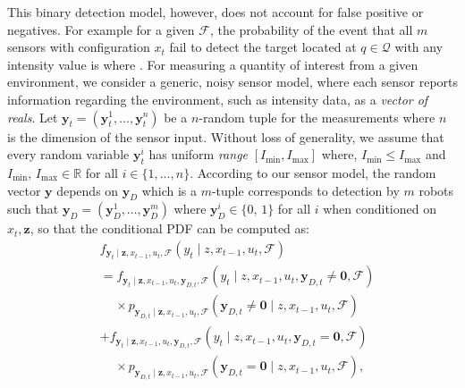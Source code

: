 \documentclass[letterpaper, 10 pt, conference]{ieeeconf}
\newcommand{\rood}[1]{{\color{red}{[#1]}}}
\begin{document}
This binary detection model, however, does not account for false positive or negatives.
For example for a given $\mathcal{F}$, the probability of the event that all $m$ sensors with configuration $x_t$ fail to detect the target located at $q \in \mathcal{Q}$ with any intensity value is
\rood{
\begin{align}
&p_{\bm{y}_{D,t} \mid
	{x}_{t-1},u_t,\bm{z},\mathcal{F}}\left(
\bm{y}_{D,t} = \bm{0} \mid {x}_{t-1},u_t,
\bm{z}=(q,I),\mathcal{F}\right) \nonumber \\
&=p_{\bm{y}_{D,t} \mid
	{x}_{t-1},u_t,\bm{q},\mathcal{F}}\left(
\bm{y}_{D,t} = \bm{0} \mid {x}_{t-1},u_t,
\bm{q}=q,\mathcal{F}\right) \nonumber \\
&= \prod_{i \in \mathcal{F}}
p_{\bm{y}_{D,t}^i \mid
	{x}_{t-1},u_t,\bm{q}}\left(
\bm{y}_{D,t}^i = 0 \mid
{x}_{t-1},u_t,\bm{q}=q\right) \nonumber
\end{align}
}
where \rood{$\bm{0}$ is a $m$-tuple of zeros}. For measuring a quantity of interest from a given environment, we consider a generic, noisy sensor model, where each sensor reports  information regarding the environment, such as intensity data, as a \emph{vector of reals}. 
Let $\bm{y}_t=(\bm{y}_t^1,\dots,\bm{y}_t^n)$ be a $n$-random tuple for the measurements where $n$ is the dimension of the sensor input. 
Without loss of generality, we assume that every random variable $\bm{y}_t^i$ has uniform \emph{range} $[I_{\min},I_{\max}]$ where, $I_{\min} \leq I_{\max}$ and $I_{\min},\,I_{\max} \in \mathbb{R}$ for all $i \in \lbrace 1,\dots,n \rbrace$. According to our sensor model, the random vector $\bm{y}$ depends on $\bm{y}_D$ which is a \rood{random} $m$-tuple corresponds to detection by $m$ robots such that $\bm{y}_D = (\bm{y}_D^1,\dots,\bm{y}_D^m)$ where $\bm{y}_D^i \in \lbrace 0,\,1 \rbrace$ for all $i$ when conditioned on $x_t,\bm{z}$, so that the conditional PDF can be computed as:
\begin{align*}
&f_{\bm{y}_t \mid \bm{z},x_{t-1},u_t,\mathcal{F}}(y_t \mid z,x_{t-1},u_t,\mathcal{F}) \\
&=f_{\bm{y}_t \mid \bm{z},x_{t-1},u_t,\bm{y}_{D,t},\mathcal{F}}(y_t \mid z,x_{t-1},u_t,\bm{y}_{D,t} \neq \mathbf{0},\mathcal{F}) \\ 
&\,\,\,\,\,\,\,\times p_{\bm{y}_{D,t} \mid \bm{z},x_{t-1},u_t,\mathcal{F}}(\bm{y}_{D,t} \neq \mathbf{0} \mid z,x_{t-1},u_t,\mathcal{F}) \nonumber\\
&+f_{\bm{y}_t \mid \bm{z},x_{t-1},u_t,\bm{y}_{D,t},\mathcal{F}}(y_t \mid z,x_{t-1},u_t,\bm{y}_{D,t}=\mathbf{0},\mathcal{F}) \\
&\,\,\,\,\,\,\,\times p_{\bm{y}_{D,t} \mid \bm{z},x_{t-1},u_t,\mathcal{F}}(\bm{y}_{D,t} =\mathbf{0} \mid z,x_{t-1},u_t,\mathcal{F}), \nonumber
\end{align*}
\end{document}
